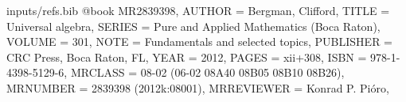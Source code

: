 \begin{filecontents*}{inputs/refs.bib}
@book {MR2839398,
    AUTHOR = {Bergman, Clifford},
     TITLE = {Universal algebra},
    SERIES = {Pure and Applied Mathematics (Boca Raton)},
    VOLUME = {301},
      NOTE = {Fundamentals and selected topics},
 PUBLISHER = {CRC Press, Boca Raton, FL},
      YEAR = {2012},
     PAGES = {xii+308},
      ISBN = {978-1-4398-5129-6},
   MRCLASS = {08-02 (06-02 08A40 08B05 08B10 08B26)},
  MRNUMBER = {2839398 (2012k:08001)},
MRREVIEWER = {Konrad P. Pi{\'o}ro},
}
\end{filecontents*}
\documentclass[12pt,reqno]{amsart}


\usepackage{amsmath,amssymb,amsfonts,amscd}


\usepackage[mathcal]{euscript}



\def\OPTpagesize{8.5in,11in}     %
\def\OPTtopmargin{1in}     %
\def\OPTbottommargin{1in}  %
\def\OPTinnermargin{1.5in}    %
\def\OPTbindingoffset{0in} %
\def\OPToutermargin{1.5in}   %
\usepackage[papersize={\OPTpagesize},
             twoside,
             includehead,
             top=\OPTtopmargin,
             bottom=\OPTbottommargin,
             inner=\OPTinnermargin,
             outer=\OPToutermargin,
             bindingoffset=\OPTbindingoffset]{geometry}

\newcommand{\alg}[1]{\ensuremath{\mathbf{#1}}}
\newcommand{\class}[1]{\ensuremath{\mathcal{#1}}}
\newcommand{\var}[1]{\ensuremath{\mathcal{#1}}}
\newcommand{\clop}[1]{\ensuremath{\mathbf{#1}}}
\newcommand{\close}[1]{\ensuremath{\overline{#1}}}
\newcommand{\Id}[1]{\ensuremath{\operatorname{Id}(#1)}}
\newcommand{\Mod}[1]{\ensuremath{\operatorname{Mod}(#1)}}
\newcommand{\defin}[1]{\textbf{#1}}
\newcommand{\Hom}[1]{\ensuremath{\operatorname{Hom}(#1)}}
\newcommand{\Epi}[1]{\ensuremath{\operatorname{Epi}(#1)}}
\newcommand{\Con}[1]{\ensuremath{\operatorname{Con}(#1)}}
\newcommand{\Sg}[2]{\ensuremath{\operatorname{Sg}^{#1}(#2)}}
\newcommand{\compose}{\ensuremath{\circ}}
\newcommand{\va}{\ensuremath{\mathbf{a}}}
\newcommand{\vb}{\ensuremath{\mathbf{b}}}

